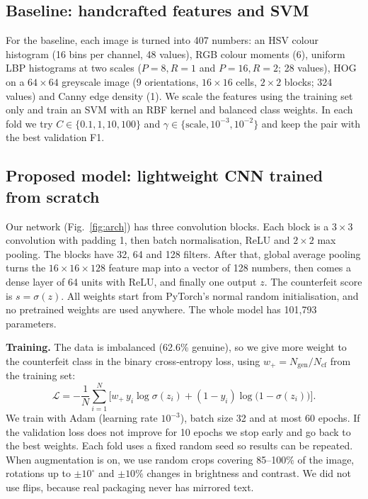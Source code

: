 \documentclass[conference]{IEEEtran}
\begin{document}
\subsection{Baseline: handcrafted features and SVM}
For the baseline, each image is turned into 407 numbers: an HSV colour histogram (16 bins per channel, 48 values), RGB colour moments (6), uniform LBP histograms at two scales ($P{=}8,R{=}1$ and $P{=}16,R{=}2$; 28 values), HOG on a $64\times64$ greyscale image (9 orientations, $16\times16$ cells, $2\times2$ blocks; 324 values) and Canny edge density (1). We scale the features using the training set only and train an SVM with an RBF kernel and balanced class weights. In each fold we try $C\in\{0.1,1,10,100\}$ and $\gamma\in\{\text{scale},10^{-3},10^{-2}\}$ and keep the pair with the best validation F1.

\subsection{Proposed model: lightweight CNN trained from scratch}
Our network (Fig.~\ref{fig:arch}) has three convolution blocks. Each block is a $3\times3$ convolution with padding 1, then batch normalisation, ReLU and $2\times2$ max pooling. The blocks have 32, 64 and 128 filters. After that, global average pooling turns the $16\times16\times128$ feature map into a vector of 128 numbers, then comes a dense layer of 64 units with ReLU, and finally one output $z$. The counterfeit score is $s=\sigma(z)$. All weights start from PyTorch's normal random initialisation, and no pretrained weights are used anywhere. The whole model has 101{,}793 parameters.

\textbf{Training.} The data is imbalanced (62.6\% genuine), so we give more weight to the counterfeit class in the binary cross-entropy loss, using $w_+=N_{\text{gen}}/N_{\text{cf}}$ from the training set:
\begin{equation}
\mathcal{L} = -\frac{1}{N}\sum_{i=1}^{N}\Big[w_+\,y_i\log\sigma(z_i) + (1-y_i)\log\big(1-\sigma(z_i)\big)\Big].
\end{equation}
We train with Adam (learning rate $10^{-3}$), batch size 32 and at most 60 epochs. If the validation loss does not improve for 10 epochs we stop early and go back to the best weights. Each fold uses a fixed random seed so results can be repeated. When augmentation is on, we use random crops covering 85--100\% of the image, rotations up to $\pm10^\circ$ and $\pm10\%$ changes in brightness and contrast. We did not use flips, because real packaging never has mirrored text.
\end{document}
